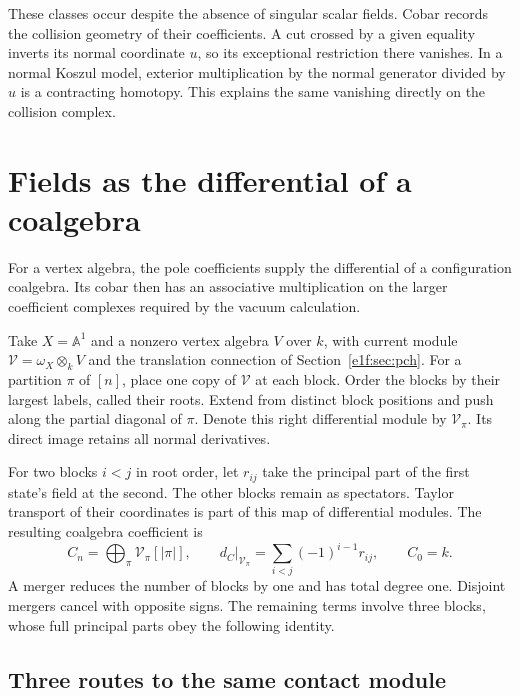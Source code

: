 These classes occur despite the absence of singular scalar
fields. Cobar records the collision geometry of their
coefficients. A cut crossed by a given equality inverts its
normal coordinate \(u\), so its exceptional restriction
there vanishes. In a normal Koszul model, exterior
multiplication by the normal generator divided by \(u\)
is a contracting homotopy. This explains the same vanishing
directly on the collision complex.

\section{Fields as the differential of a coalgebra}
\label{e1f:sec:open}
\label{e1f:sec:residue-realization}

For a vertex algebra, the pole coefficients supply the
differential of a configuration coalgebra. Its cobar then
has an associative multiplication on the larger coefficient
complexes required by the vacuum calculation.

Take\label{e1f:def:partition-residue-coefficients} \(X=\mathbb A^1\) and a nonzero vertex algebra \(V\)
over \(k\), with current module
\(\mathscr V=\omega_X\otimes_kV\) and the translation
connection of Section~\ref{e1f:sec:pch}. For a partition
\(\pi\) of \([n]\), place one copy of \(\mathscr V\)
at each block. Order the blocks by their largest labels,
called their roots. Extend from distinct block positions
and push along the partial diagonal of \(\pi\). Denote
this right differential module by \(\mathcal V_\pi\).
Its direct image retains all normal derivatives.

For two blocks \(i<j\) in root order, let \(r_{ij}\)
take the principal part of the first state's field at the
second. The other blocks remain as spectators. Taylor
transport of their coordinates is part of this map of
differential modules. The resulting coalgebra coefficient is
\begin{equation}\label{e1f:eq:residue-coalgebra}
 C_n=\bigoplus_\pi\mathcal V_\pi[|\pi|],
 \qquad
 d_C|_{\mathcal V_\pi}
          =\sum_{i<j}(-1)^{i-1}r_{ij},
 \qquad C_0=k.
\end{equation}
A merger reduces the number of blocks by one and has total
degree one. Disjoint mergers cancel with opposite signs.
The remaining terms involve three blocks, whose full
principal parts obey the following identity.

\subsection{Three routes to the same contact module}

